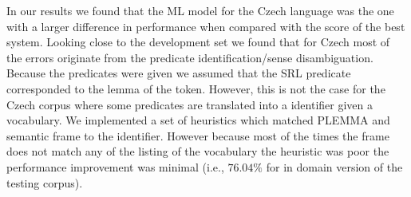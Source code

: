 
In our results we found that the ML model for the Czech language was the one 
with a larger difference in performance when compared with the score of the best 
system. Looking close to the development set we found that for Czech most of the 
errors originate from the predicate identification/sense disambiguation.  
Because the predicates were given we assumed that the SRL predicate corresponded 
to the lemma of the token.  However, this is not the case for the Czech corpus 
where some predicates are translated into a identifier given a vocabulary. We 
implemented a set of heuristics which matched PLEMMA and semantic frame to the 
identifier.  However because most of the times the frame does not match any of 
the listing of the vocabulary the heuristic was poor the performance improvement 
was minimal (i.e., $76.04\%$ for in domain version of the testing corpus). 




